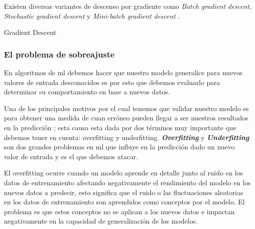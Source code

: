 Existen diversas variantes de descenso por gradiente como \textit{Batch gradient descent}, \textit{Stochastic gradient descent} y \textit{Mini-batch gradient descent} \citep{variants_gd}.


\begin{algorithm}[H]
\caption{Gradient Descent}\label{euclid}
\begin{algorithmic}[1]

\State $\textbf{INPUT} \gets (X, Y, \theta,iteraciones, \alpha)$
\State $\textbf{OUTPUT} \gets \theta $
\State \textbf{i} = 0
\While {\textbf{i} <  iteraciones}{
\State i++
\State	error = \textit{Función\_Costo}(X, Y, \theta)

\If {error < min\_error}
	\State	break
\Else
	\State \texttt{\theta_{j} := \theta_{j} - \alpha \frac{\partial}{\partial \theta} J(\theta_{1}, \theta_{0})}
	
\EndIf
\EndWhile
\end{algorithmic}
\end{algorithm}



\subsubsection{El problema de sobreajuste}\label{sub:validacion-modelo}

En algoritmos de \ac{ml} debemos hacer que nuestro modelo generalice para nuevos valores de entrada desconocidos es por esto que debemos evaluarlo para determinar su comportamiento en base a nuevos datos. 

Una de los principales motivos por el cual tenemos que validar nuestro modelo es para obtener una medida de cuan erróneo pueden llegar a ser nuestros resultados en la predicción ; esta causa esta dada por dos términos muy importante que debemos tener en cuenta: overfitting y underfitting. \textit{\textbf{Overfitting}} y \textit{\textbf{Underfitting}} son dos grandes problemas en \ac{ml} que influye en la predicción dado un nuevo valor de entrada y es el que debemos atacar. 

El overfitting ocurre cuando un modelo aprende en detalle junto al ruido en los datos de entrenamiento afectando negativamente el rendimiento del modelo en los nuevos datos a predecir, esto significa que el ruido o las fluctuaciones aleatorias en los datos de entrenamiento son aprendidos como conceptos por el modelo. El problema es que estos conceptos no se aplican a los nuevos datos e impactan negativamente en la capacidad de generalización de los modelos.

